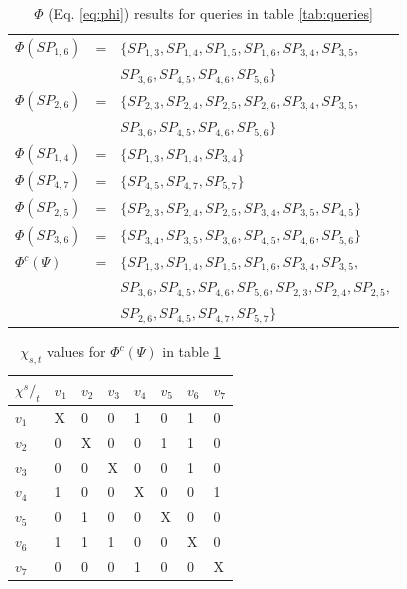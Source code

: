 \begin{table}
\begin{tabular}{lcp{}}
$\Phi(SP_{1,6})$ &= 	& $\{SP_{1,3},SP_{1,4},SP_{1,5},SP_{1,6},SP_{3,4},SP_{3,5},$\\
		 &	& $SP_{3,6},SP_{4,5},SP_{4,6},SP_{5,6}\}$ \\
$\Phi(SP_{2,6})$ &=  	& $\{SP_{2,3},SP_{2,4},SP_{2,5},SP_{2,6},SP_{3,4},SP_{3,5},$ \\
		 &	& $SP_{3,6},SP_{4,5},SP_{4,6},SP_{5,6}\}$ \\
$\Phi(SP_{1,4})$ &=  	& $\{SP_{1,3},SP_{1,4},SP_{3,4}\}$ \\
$\Phi(SP_{4,7})$ &=  	& $\{SP_{4,5},SP_{4,7},SP_{5,7}\}$ \\
$\Phi(SP_{2,5})$ &=  	& $\{SP_{2,3},SP_{2,4},SP_{2,5},SP_{3,4},SP_{3,5},SP_{4,5}\}$ \\
$\Phi(SP_{3,6})$ &=  	& $\{SP_{3,4},SP_{3,5},SP_{3,6},SP_{4,5},SP_{4,6},SP_{5,6}\}$ \\\hline
$\Phi^c(\Psi)$ 	 &=  	& $\{SP_{1,3},SP_{1,4},SP_{1,5},SP_{1,6},SP_{3,4},SP_{3,5},$ \\
		 &	& $SP_{3,6},SP_{4,5},SP_{4,6},SP_{5,6},SP_{2,3},SP_{2,4},SP_{2,5},$ \\
		 &	& $SP_{2,6},SP_{4,5},SP_{4,7},SP_{5,7}\}$  \\
\end{tabular}
\caption{$\Phi$ (Eq. \ref{eq:phi}) results for queries in table \ref{tab:queries}}
\label{tab:chi}
\end{table}


\begin{table}
\center
\begin{tabular}{|l||l|l|l|l|l|l|l|}
\textbf{$\chi {^s/_t}$}	& $v_1$	& $v_2$	& $v_3$	& $v_4$	& $v_5$	& $v_6$	& $v_7$ \\\hline
$v_1$			& X	& 0	& 0	& 1	& 0	& 1	& 0	 \\
$v_2$			& 0	& X	& 0	& 0	& 1	& 1	& 0	 \\
$v_3$			& 0	& 0	& X	& 0	& 0	& 1	& 0	 \\
$v_4$			& 1	& 0	& 0	& X	& 0	& 0	& 1	 \\
$v_5$			& 0	& 1	& 0	& 0	& X	& 0	& 0	 \\
$v_6$			& 1	& 1	& 1	& 0	& 0	& X	& 0	 \\
$v_7$			& 0	& 0	& 0	& 1	& 0	& 0	& X	 \\
\end{tabular}
\caption{$\chi_{s,t}$ values for $\Phi^c(\Psi)$ in table \ref{tab:chi}}
\label{tab:freq}
\end{table}



